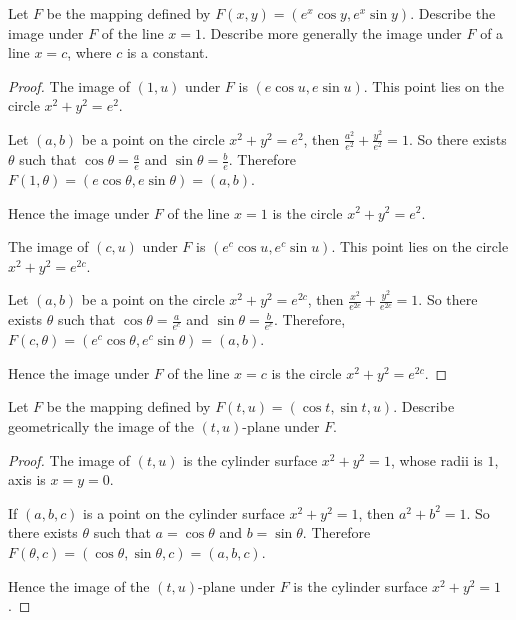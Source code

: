 \begin{exercise}
    Let $F$ be the mapping defined by $F(x, y) = (e^{x}\cos y, e^{x}\sin y)$. Describe the image under $F$ of the line $x = 1$. Describe more generally the image under $F$ of a line $x = c$, where $c$ is a constant.
\end{exercise}

\begin{proof}
    The image of $(1, u)$ under $F$ is $(e\cos u, e\sin u)$. This point lies on the circle $x^{2} + y^{2} = e^{2}$.

    Let $(a, b)$ be a point on the circle $x^{2} + y^{2} = e^{2}$, then $\frac{a^{2}}{e^{2}} + \frac{y^{2}}{e^{2}} = 1$. So there exists $\theta$ such that $\cos{\theta} = \frac{a}{e}$ and $\sin{\theta} = \frac{b}{e}$. Therefore $F(1, \theta) = (e\cos{\theta}, e\sin{\theta}) = (a, b)$.

    Hence the image under $F$ of the line $x = 1$ is the circle $x^{2} + y^{2} = e^{2}$.

    The image of $(c, u)$ under $F$ is $(e^{c}\cos u, e^{c}\sin u)$. This point lies on the circle $x^{2} + y^{2} = e^{2c}$.

    Let $(a, b)$ be a point on the circle $x^{2} + y^{2} = e^{2c}$, then $\frac{x^{2}}{e^{2c}} + \frac{y^{2}}{e^{2c}} = 1$. So there exists $\theta$ such that $\cos{\theta} = \frac{a}{e^{c}}$ and $\sin{\theta} = \frac{b}{e^{c}}$. Therefore, $F(c, \theta) = (e^{c}\cos{\theta}, e^{c}\sin{\theta}) = (a, b)$.

    Hence the image under $F$ of the line $x = c$ is the circle $x^{2} + y^{2} = e^{2c}$.
\end{proof}

\begin{exercise}
    Let $F$ be the mapping defined by $F(t, u) = (\cos t, \sin t, u)$. Describe geometrically the image of the $(t, u)$-plane under $F$.
\end{exercise}

\begin{proof}
    The image of $(t, u)$ is the cylinder surface $x^{2} + y^{2} = 1$, whose radii is $1$, axis is $x = y = 0$.

    If $(a, b, c)$ is a point on the cylinder surface $x^{2} + y^{2} = 1$, then $a^{2} + b^{2} = 1$. So there exists $\theta$ such that $a = \cos\theta$ and $b = \sin\theta$. Therefore $F(\theta, c) = (\cos\theta, \sin\theta, c) = (a, b, c)$.

    Hence the image of the $(t, u)$-plane under $F$ is the cylinder surface $x^{2} + y^{2} = 1$.
\end{proof}

